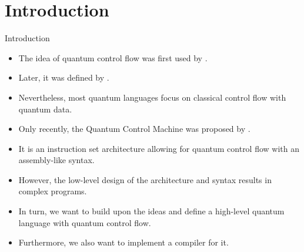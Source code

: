 \section{Introduction}


\begin{frame}{Introduction}
    \begin{itemize}
        \item The idea of quantum control flow was first used by \cite{AlGr05}.
        \item Later, it was defined by \cite{YYF12}.
        \item Nevertheless, most quantum languages focus on classical control flow with quantum data.
        \item Only recently, the Quantum Control Machine was proposed by \cite{YVC24}.
        \item It is an instruction set architecture allowing for quantum control flow with an assembly-like syntax.
        \item However, the low-level design of the architecture and syntax results in complex programs.
        \item In turn, we want to build upon the ideas and define a high-level quantum language with quantum control flow.
        \item Furthermore, we also want to implement a compiler for it.
    \end{itemize}
\end{frame}